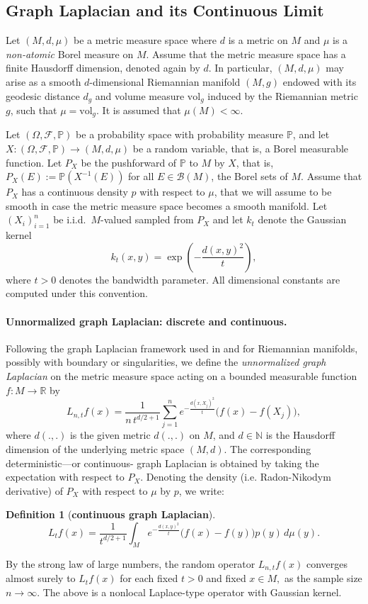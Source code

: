 \documentclass{amsart}
\let\oldcitet\citet
\renewcommand{\citet}[1]{\textcolor{blue}{\oldcitet{#1}}}
\theoremstyle{definition}
\newtheorem{definition}[theorem]{Definition}
\theoremstyle{remark}
\newcommand{\0}{\boldsymbol{0}}
\begin{document}
\subsection{Graph Laplacian and its Continuous Limit}

Let $(M,d,\mu)$ be a metric measure space where $d$ is a metric on $M$ and $\mu$ is a \textit{non-atomic} Borel measure on $M$. Assume that the metric measure space has a finite Hausdorff dimension, denoted again by $d$.
In particular, $(M,d,\mu)$ may arise as a smooth $d$-dimensional Riemannian manifold $(M,g)$ endowed with its geodesic distance $d_g$ and volume measure $\mathrm{vol}_g$ induced by the Riemannian metric $g$, such that $\mu = \mathrm{vol}_g$.  
It is assumed that $\mu(M)< \infty.$ 

Let $(\Omega, \mathcal{F}, \mathbb{P})$ be a probability space with probability measure $\mathbb{P}$, and let $X\colon (\Omega, \mathcal{F}, \mathbb{P})\to (M,d,\mu)$ be a random variable, that is, a Borel measurable function. Let $P_X$ be the pushforward of $\mathbb{P}$ to $M$ by $X$, that is, $P_X(E):=\mathbb{P}(X^{-1}(E))$ for all $E \in \mathcal{B}(M)$, the Borel sets of $M$.
Assume that $P_X$ has a continuous density $p$ with respect to $\mu$, that we will assume to be smooth in case the metric measure space becomes a smooth manifold.
Let $(X_i)_{i=1}^n$ be i.i.d.\ $M$-valued sampled from $P_X$ and let $k_t$ denote the Gaussian kernel
\[
k_t(x,y) = \exp\!\left(-\frac{d(x,y)^2}{t}\right),
\]
where $t>0$ denotes the bandwidth parameter. All dimensional constants are computed under this convention.

\paragraph{\textbf{Unnormalized graph Laplacian: discrete and continuous.}}
Following the graph Laplacian framework used in \citet{PalTewodrose2025} and \citet{BelkinQueWangZhou2012} for Riemannian manifolds, possibly with boundary or singularities, we define the \emph{unnormalized graph Laplacian} on the metric measure space acting on a bounded measurable function $f\colon M\to\mathbb{R}$ by
\begin{equation}\label{eq:discrete_GL}
L_{n,t}f(x)
= \frac{1}{n\,t^{d/2+1}}\sum_{j=1}^n 
  e^{-\frac{d(x,X_j)^2}{t}}\big(f(x)-f(X_j)\big),
\end{equation}
where $d(.,.)$ is the given metric $d(.,.)$ on $M$, and $d\in \mathbb{N}$ is the Hausdorff dimension of the underlying metric space $(M,d).$ The corresponding deterministic—or continuous- graph Laplacian is obtained by taking the expectation with respect to $P_X$. Denoting the density (i.e. Radon-Nikodym derivative) of $P_X$ with respect to $\mu$ by $p$, we write:
\begin{definition}[\textbf{continuous graph Laplacian}]\label{eq:continuous_GL}
\[
L_t f(x)
= \frac{1}{t^{d/2+1}} \int_M
  e^{-\frac{d(x,y)^2}{t}}\big(f(x)-f(y)\big) p(y)\,d\mu(y).
\]
\end{definition}
By the strong law of large numbers, the random operator $L_{n,t}f(x)$ converges almost surely to $L_tf(x)$ for each fixed $t>0$ and fixed $x\in M,$ as the sample size $n\to\infty$. The above is a nonlocal Laplace-type operator with Gaussian kernel.
\end{document}

